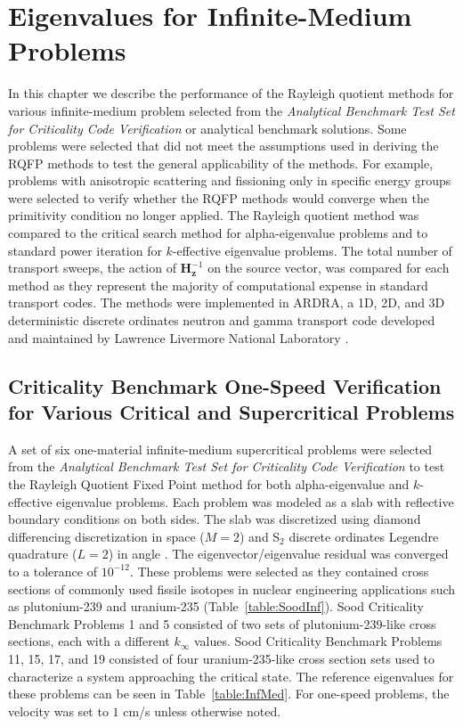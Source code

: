 \chapter{Eigenvalues for Infinite-Medium Problems}%

In this chapter we describe the performance of the Rayleigh quotient methods for various infinite-medium problem selected from the \textit{Analytical Benchmark Test Set for Criticality Code Verification} \cite{sood2003analytical} or analytical benchmark solutions. Some problems were selected that did not meet the assumptions used in deriving the RQFP methods to test the general applicability of the methods. For example, problems with anisotropic scattering and fissioning only in specific energy groups were selected to verify whether the RQFP methods would converge when the primitivity condition no longer applied. The Rayleigh quotient method was compared to the critical search method \cite{hill_efficient_1983} for alpha-eigenvalue problems and to standard power iteration for $k$-effective eigenvalue problems. The total number of transport sweeps, the action of $\mathbf{H}_{\mathbf{z}}^{-1}$ on the source vector, was compared for each method as they represent the majority of computational expense in standard transport codes. The methods were implemented in ARDRA, a 1D, 2D, and 3D deterministic discrete ordinates neutron and gamma transport code developed and maintained by Lawrence Livermore National Laboratory \cite{hanebutte_ardra_1999}.

\section{Criticality Benchmark One-Speed Verification for Various Critical and Supercritical Problems}

A set of six one-material infinite-medium supercritical problems were selected from the \textit{Analytical Benchmark Test Set for Criticality Code Verification} \cite{sood2003analytical} to test the Rayleigh Quotient Fixed Point method for both alpha-eigenvalue and $k$-effective eigenvalue problems. Each problem was modeled as a slab with reflective boundary conditions on both sides. The slab was discretized using diamond differencing discretization in space ($M = 2$) and S$_{2}$ discrete ordinates Legendre quadrature ($L = 2$) in angle \cite{lewis_computational_1984}. The eigenvector/eigenvalue residual was converged to a tolerance of $10^{-12}$. These problems were selected as they contained cross sections of commonly used fissile isotopes in nuclear engineering applications such as plutonium-239 and uranium-235 (Table~\ref{table:SoodInf}). Sood Criticality Benchmark Problems 1 and 5 consisted of two sets of plutonium-239-like cross sections, each with a different $k_{\infty}$ values. Sood Criticality Benchmark Problems 11, 15, 17, and 19 consisted of four uranium-235-like cross section sets used to characterize a system approaching the critical state. The reference eigenvalues for these problems can be seen in Table~\ref{table:InfMed}. For one-speed problems, the velocity was set to $1$ cm/s unless otherwise noted.

